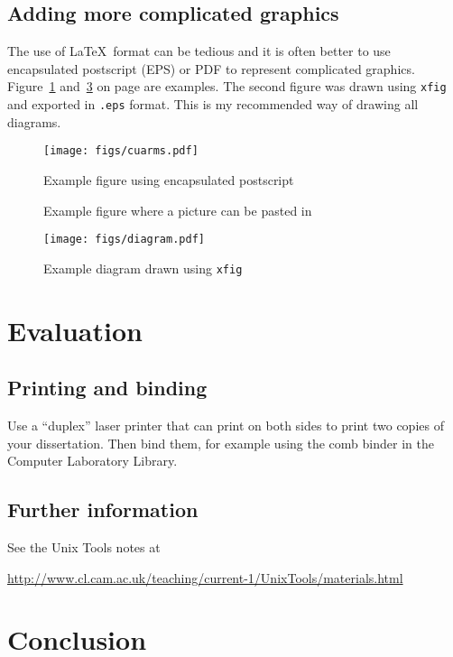 \documentclass[12pt,a4paper,twoside,openright, hidelinks]{report}
\begin{document}
\section{Adding more complicated graphics}

The use of \LaTeX\ format can be tedious and it is often better to use
encapsulated postscript (EPS) or PDF to represent complicated graphics.
Figure~\ref{epsfig} and~\ref{xfig} on page \pageref{xfig} are
examples. The second figure was drawn using \texttt{xfig} and exported in
{\tt.eps} format. This is my recommended way of drawing all diagrams.


\begin{figure}[tbh]
\centerline{\texttt{[image: figs/cuarms.pdf]}}
\caption{Example figure using encapsulated postscript}
\label{epsfig}
\end{figure}

\begin{figure}[tbh]
\vspace{4in}
\caption{Example figure where a picture can be pasted in}
\label{pastedfig}
\end{figure}


\begin{figure}[tbh]
\centerline{\texttt{[image: figs/diagram.pdf]}}
\caption{Example diagram drawn using \texttt{xfig}}
\label{xfig}
\end{figure}


\chapter{Evaluation}

\section{Printing and binding}

Use a ``duplex'' laser printer that can print on both sides to print
two copies of your dissertation. Then bind them, for example using the
comb binder in the Computer Laboratory Library.

\section{Further information}

See the Unix Tools notes at

\url{http://www.cl.cam.ac.uk/teaching/current-1/UnixTools/materials.html}


\chapter{Conclusion}
\end{document}

